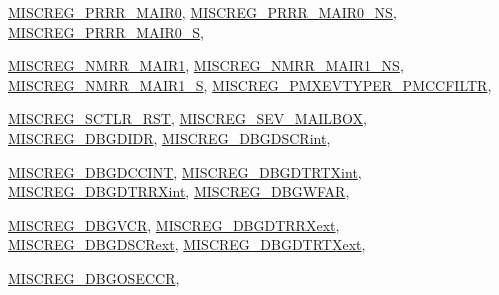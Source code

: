 \begin{DoxyCompactItemize}
\hyperlink{namespaceArmISA_a1e522017e015d4c7efd6b2360143aa67a06402af5d505491971085b160fd3805d}{MISCREG\_\-PRRR\_\-MAIR0}, 
\hyperlink{namespaceArmISA_a1e522017e015d4c7efd6b2360143aa67a34d1fc2929ce89a759178fcac5bb8614}{MISCREG\_\-PRRR\_\-MAIR0\_\-NS}, 
\hyperlink{namespaceArmISA_a1e522017e015d4c7efd6b2360143aa67a0d026db3bee85fe3d84f627465650778}{MISCREG\_\-PRRR\_\-MAIR0\_\-S}, 
\par
\hyperlink{namespaceArmISA_a1e522017e015d4c7efd6b2360143aa67adc96a8c84d1d2ff735eec951586a4f48}{MISCREG\_\-NMRR\_\-MAIR1}, 
\hyperlink{namespaceArmISA_a1e522017e015d4c7efd6b2360143aa67a53cfdceeab019f8e76983d33b02020d5}{MISCREG\_\-NMRR\_\-MAIR1\_\-NS}, 
\hyperlink{namespaceArmISA_a1e522017e015d4c7efd6b2360143aa67a76125bd5750c08c47803ffc2b6466ef0}{MISCREG\_\-NMRR\_\-MAIR1\_\-S}, 
\hyperlink{namespaceArmISA_a1e522017e015d4c7efd6b2360143aa67ab15c3e97aaa0077a96fa1ed58168ee47}{MISCREG\_\-PMXEVTYPER\_\-PMCCFILTR}, 
\par
\hyperlink{namespaceArmISA_a1e522017e015d4c7efd6b2360143aa67adea184d7ffdfc3a4fc2946a799b3fab1}{MISCREG\_\-SCTLR\_\-RST}, 
\hyperlink{namespaceArmISA_a1e522017e015d4c7efd6b2360143aa67aaf7cf72c549345cffed603af1ddea5de}{MISCREG\_\-SEV\_\-MAILBOX}, 
\hyperlink{namespaceArmISA_a1e522017e015d4c7efd6b2360143aa67a6ecabb08679e4a34b749f49efe0816b9}{MISCREG\_\-DBGDIDR}, 
\hyperlink{namespaceArmISA_a1e522017e015d4c7efd6b2360143aa67ae11803337005b65ba3e848309e2b076f}{MISCREG\_\-DBGDSCRint}, 
\par
\hyperlink{namespaceArmISA_a1e522017e015d4c7efd6b2360143aa67a39e8a2b7db61b88c6a2f933e2988543e}{MISCREG\_\-DBGDCCINT}, 
\hyperlink{namespaceArmISA_a1e522017e015d4c7efd6b2360143aa67a666e7b7884523aee1e7c8f50ed97a92c}{MISCREG\_\-DBGDTRTXint}, 
\hyperlink{namespaceArmISA_a1e522017e015d4c7efd6b2360143aa67a8b97488eb8ba77c28985b8b05b39b2cd}{MISCREG\_\-DBGDTRRXint}, 
\hyperlink{namespaceArmISA_a1e522017e015d4c7efd6b2360143aa67abdbaae09213a2e992a01cc3c7bd4ecf0}{MISCREG\_\-DBGWFAR}, 
\par
\hyperlink{namespaceArmISA_a1e522017e015d4c7efd6b2360143aa67a4fb449dd10686a79f881f73b97e7eb83}{MISCREG\_\-DBGVCR}, 
\hyperlink{namespaceArmISA_a1e522017e015d4c7efd6b2360143aa67ac0044bdb053b84c894bd418e9396cbf9}{MISCREG\_\-DBGDTRRXext}, 
\hyperlink{namespaceArmISA_a1e522017e015d4c7efd6b2360143aa67ab84818872ccb140307ae239b2a52df11}{MISCREG\_\-DBGDSCRext}, 
\hyperlink{namespaceArmISA_a1e522017e015d4c7efd6b2360143aa67a09c0a0fa54d53b40d749a24b5f611047}{MISCREG\_\-DBGDTRTXext}, 
\par
\hyperlink{namespaceArmISA_a1e522017e015d4c7efd6b2360143aa67a084ecf516e9496751d2a56ae362ce766}{MISCREG\_\-DBGOSECCR}, 

\end{DoxyCompactItemize}
